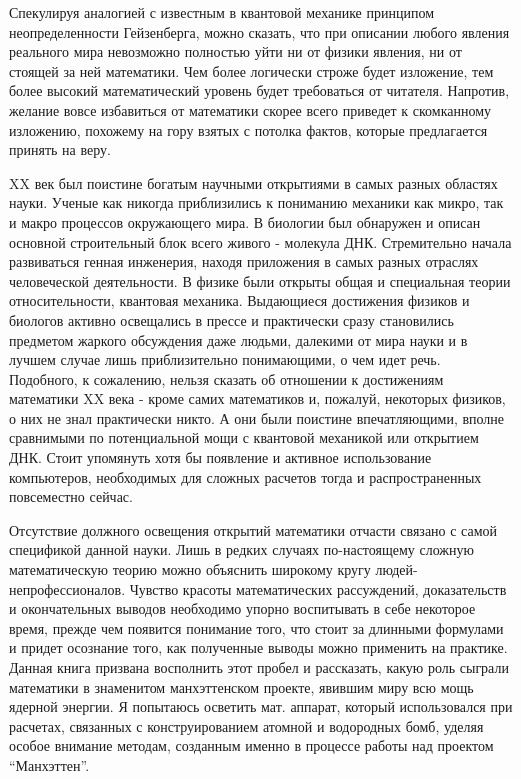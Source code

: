 Спекулируя аналогией с известным в квантовой механике принципом неопределенности Гейзенберга, можно сказать, что при описании любого явления реального мира невозможно полностью уйти ни от физики явления, ни от стоящей за ней математики.
Чем более логически строже будет изложение, тем более высокий математический уровень будет требоваться от читателя.
Напротив, желание вовсе избавиться от математики скорее всего приведет к скомканному изложению, похожему на гору взятых с потолка фактов, которые предлагается принять на веру.











XX век был поистине богатым научными открытиями в самых разных областях науки. Ученые как никогда приблизились к пониманию механики как микро, так и макро процессов окружающего мира. В биологии был обнаружен и описан основной строительный блок всего живого - молекула ДНК. Стремительно начала развиваться генная инженерия, находя приложения в самых разных отраслях человеческой деятельности. В физике были открыты общая и специальная теории относительности, квантовая механика. Выдающиеся достижения физиков и биологов активно освещались в прессе и практически сразу становились предметом жаркого обсуждения даже людьми, далекими от мира науки и в лучшем случае лишь приблизительно понимающими, о чем идет речь. 
Подобного, к сожалению, нельзя сказать об отношении к достижениям математики XX века - кроме самих математиков и, пожалуй, некоторых физиков, о них не знал практически никто. А они были поистине впечатляющими, вполне сравнимыми по потенциальной мощи с квантовой механикой или открытием ДНК. Стоит упомянуть хотя бы появление и активное использование компьютеров, необходимых для сложных расчетов тогда и распространенных повсеместно сейчас.

Отсутствие должного освещения открытий математики отчасти связано с самой спецификой данной науки. Лишь в редких случаях по-настоящему сложную математическую теорию можно объяснить широкому кругу людей-непрофессионалов. Чувство красоты математических рассуждений, доказательств и окончательных выводов необходимо упорно воспитывать в себе некоторое время, прежде чем появится понимание того, что стоит за длинными формулами и придет осознание того, как полученные выводы можно применить на практике.
Данная книга призвана восполнить этот пробел и рассказать, какую роль сыграли математики в знаменитом манхэттенском проекте, явившим миру всю мощь ядерной энергии. Я попытаюсь осветить мат. аппарат, который использовался при расчетах, связанных с конструированием атомной и водородных бомб, уделяя особое внимание методам, созданным именно в процессе работы над проектом “Манхэттен”.



